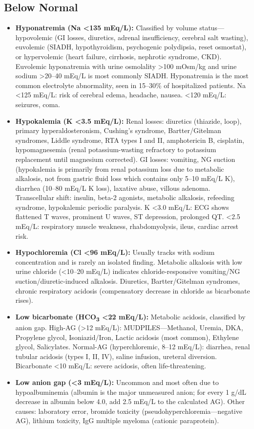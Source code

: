 \subsection*{Below Normal}
\begin{itemize}
  \item \textbf{Hyponatremia (Na <135 mEq/L):} Classified by volume status---hypovolemic (GI losses, diuretics, adrenal insufficiency, cerebral salt wasting), euvolemic (SIADH, hypothyroidism, psychogenic polydipsia, reset osmostat), or hypervolemic (heart failure, cirrhosis, nephrotic syndrome, CKD). Euvolemic hyponatremia with urine osmolality >100 mOsm/kg and urine sodium >20--40 mEq/L is most commonly SIADH. Hyponatremia is the most common electrolyte abnormality, seen in 15--30\% of hospitalized patients. Na <125 mEq/L: risk of cerebral edema, headache, nausea. <120 mEq/L: seizures, coma.
  \item \textbf{Hypokalemia (K <3.5 mEq/L):} Renal losses: diuretics (thiazide, loop), primary hyperaldosteronism, Cushing's syndrome, Bartter/Gitelman syndromes, Liddle syndrome, RTA types I and II, amphotericin B, cisplatin, hypomagnesemia (renal potassium-wasting refractory to potassium replacement until magnesium corrected). GI losses: vomiting, NG suction (hypokalemia is primarily from renal potassium loss due to metabolic alkalosis, not from gastric fluid loss which contains only 5--10 mEq/L K), diarrhea (10--80 mEq/L K loss), laxative abuse, villous adenoma. Transcellular shift: insulin, beta-2 agonists, metabolic alkalosis, refeeding syndrome, hypokalemic periodic paralysis. K <3.0 mEq/L: ECG shows flattened T waves, prominent U waves, ST depression, prolonged QT. <2.5 mEq/L: respiratory muscle weakness, rhabdomyolysis, ileus, cardiac arrest risk.
  \item \textbf{Hypochloremia (Cl <96 mEq/L):} Usually tracks with sodium concentration and is rarely an isolated finding. Metabolic alkalosis with low urine chloride (<10--20 mEq/L) indicates chloride-responsive vomiting/NG suction/diuretic-induced alkalosis. Diuretics, Bartter/Gitelman syndromes, chronic respiratory acidosis (compensatory decrease in chloride as bicarbonate rises).
  \item \textbf{Low bicarbonate (HCO\textsubscript{3} <22 mEq/L):} Metabolic acidosis, classified by anion gap. High-AG (>12 mEq/L): MUDPILES---Methanol, Uremia, DKA, Propylene glycol, Isoniazid/Iron, Lactic acidosis (most common), Ethylene glycol, Salicylates. Normal-AG (hyperchloremic, 8--12 mEq/L): diarrhea, renal tubular acidosis (types I, II, IV), saline infusion, ureteral diversion. Bicarbonate <10 mEq/L: severe acidosis, often life-threatening.
  \item \textbf{Low anion gap (<3 mEq/L):} Uncommon and most often due to hypoalbuminemia (albumin is the major unmeasured anion; for every 1 g/dL decrease in albumin below 4.0, add 2.5 mEq/L to the calculated AG). Other causes: laboratory error, bromide toxicity (pseudohyperchloremia---negative AG), lithium toxicity, IgG multiple myeloma (cationic paraprotein).
\end{itemize}

